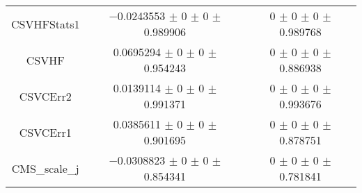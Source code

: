 \begin{table}
\begin{tabular}{ccc}
CSVHFStats1 	& \num{-0.0243553} $\pm$ \num{0} $\pm$ \num{0} $\pm$ \num{0.989906} 	& \num{0} $\pm$ \num{0} $\pm$ \num{0} $\pm$ \num{0.989768}\\
CSVHF 	& \num{0.0695294} $\pm$ \num{0} $\pm$ \num{0} $\pm$ \num{0.954243} 	& \num{0} $\pm$ \num{0} $\pm$ \num{0} $\pm$ \num{0.886938}\\
CSVCErr2 	& \num{0.0139114} $\pm$ \num{0} $\pm$ \num{0} $\pm$ \num{0.991371} 	& \num{0} $\pm$ \num{0} $\pm$ \num{0} $\pm$ \num{0.993676}\\
CSVCErr1 	& \num{0.0385611} $\pm$ \num{0} $\pm$ \num{0} $\pm$ \num{0.901695} 	& \num{0} $\pm$ \num{0} $\pm$ \num{0} $\pm$ \num{0.878751}\\
CMS\_scale\_j 	& \num{-0.0308823} $\pm$ \num{0} $\pm$ \num{0} $\pm$ \num{0.854341} 	& \num{0} $\pm$ \num{0} $\pm$ \num{0} $\pm$ \num{0.781841}\\
\bottomrule
\end{tabular}
\end{table}